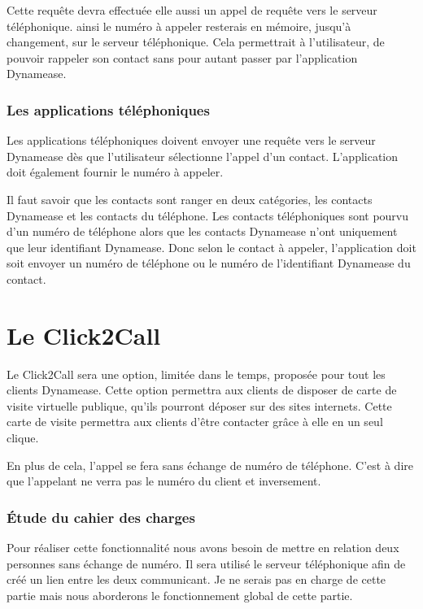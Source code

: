 Cette requête devra effectuée elle aussi un appel de requête vers le serveur téléphonique. ainsi le numéro à appeler resterais en mémoire, jusqu'à changement, sur le serveur téléphonique. Cela permettrait à l'utilisateur, de pouvoir rappeler son contact sans pour autant passer par l'application Dynamease.

\subsubsection{Les applications téléphoniques}

Les applications téléphoniques doivent envoyer une requête vers le serveur Dynamease dès que l'utilisateur sélectionne l'appel d'un contact. L'application doit également fournir le numéro à appeler.

Il faut savoir que les contacts sont ranger en deux catégories, les contacts Dynamease et les contacts du téléphone. Les contacts téléphoniques sont pourvu d'un numéro de téléphone alors que les contacts Dynamease n'ont uniquement que leur identifiant Dynamease. Donc selon le contact à appeler, l'application doit soit envoyer un numéro de téléphone ou le numéro de l'identifiant Dynamease du contact.

\section{Le Click2Call}

Le Click2Call sera une option, limitée dans le temps, proposée pour tout les clients Dynamease. Cette option permettra aux clients de disposer de carte de visite virtuelle publique, qu'ils pourront déposer sur des sites internets. Cette carte de visite permettra aux clients d'être contacter grâce à elle en un seul clique.

En plus de cela, l'appel se fera sans échange de numéro de téléphone. C'est à dire que l'appelant ne verra pas le numéro du client et inversement.

\subsubsection{Étude du cahier des charges}

Pour réaliser cette fonctionnalité nous avons besoin de mettre en relation deux personnes sans échange de numéro. Il sera utilisé le serveur téléphonique afin de créé un lien entre les deux communicant. Je ne serais pas en charge de cette partie mais nous aborderons le fonctionnement global de cette partie.

